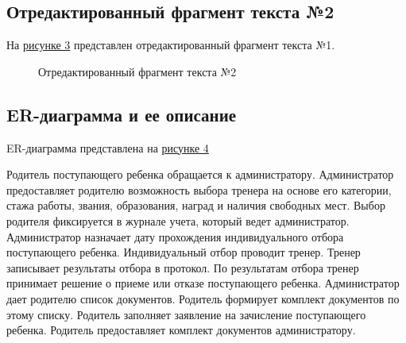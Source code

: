 \documentclass[12pt,a4paper,final]{article} %
\begin{document}
\subsection{Отредактированный фрагмент текста №2}
\par На \hyperref[fig:im2]{рисунке 3} представлен отредактированный фрагмент текста №1.
\begin{figure}[htbp]
	\centering
	\caption{Отредактированный фрагмент текста №2}
	\label{fig:im3}
\end{figure}

\newpage
\subsection{ER-диаграмма и ее описание}
\par ER-диаграмма представлена на \href{er.pdf}{рисунке 4}
\par Родитель поступающего ребенка обращается к администратору. Администратор предоставляет родителю возможность выбора тренера на основе его категории, стажа работы, звания, образования, наград и наличия свободных мест. Выбор родителя фиксируется в журнале учета, который ведет администратор. Администратор назначает дату прохождения индивидуального отбора поступающего ребенка. Индивидуальный отбор проводит тренер. Тренер записывает результаты отбора в протокол. По результатам отбора тренер принимает решение о приеме или отказе поступающего ребенка. Администратор дает родителю список документов. Родитель формирует комплект документов по этому списку. Родитель заполняет заявление на зачисление поступающего ребенка. Родитель предоставляет комплект документов администратору.
\newpage
 
\setcounter{figure}{4}
\end{document}

